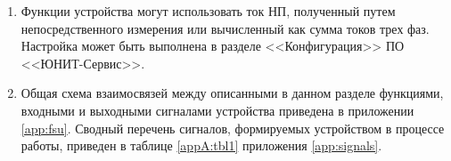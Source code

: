 \begin{enumerate}
\begin{itemize}
    \item погрешность выдержки времени -- не более 40 мс при выдержках менее 1,5 с и не более 2\% от уставки при выдержках времени выше 1,5 с;
    \item погрешность выдержки времени зависимой времятоковой характеристики не более 40 мс при уставке меньше 0,6 с, не более 12,5\% при 1,1≤I/Iср<5, не более 7,5\% при 5≤I/Iср<10 и не более 5\% при I/Iср≥10.
\end{itemize}
Специфические требования к характеристикам функциональных блоков приведены в описаниях соответствующих функций в данном разделе.
\item
Функции устройства могут использовать ток НП, полученный путем непосредственного измерения или вычисленный как сумма токов трех фаз. Настройка может быть выполнена в разделе <<Конфигурация>> ПО <<ЮНИТ-Сервис>>.
\item
Общая схема взаимосвязей между описанными в данном разделе функциями, входными и выходными сигналами устройства приведена в приложении \ref{app:fsu}.
Сводный перечень сигналов, формируемых устройством в процессе работы, приведен в таблице \ref{appA:tbl1} приложения \ref{app:signals}.

\end{enumerate}
